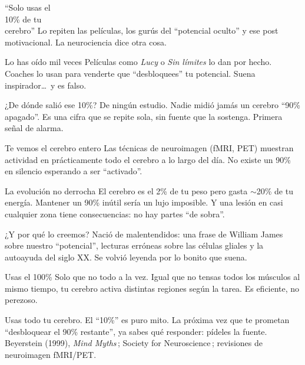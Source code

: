 \documentclass[10pt]{beamer}
\begin{document}
  {``Solo usas el\\ 10\% de tu\\ cerebro''}
  {Lo repiten las películas, los gurús del ``potencial oculto'' y ese
   post motivacional. La neurociencia dice otra cosa.}

  {Lo has oído mil veces}
  {Películas como \emph{Lucy} o \emph{Sin límites} lo dan por hecho.
   Coaches lo usan para venderte que ``desbloquees'' tu potencial.
   Suena inspirador\dots\ y es falso.}

  {¿De dónde salió ese 10\%?}
  {De ningún estudio. Nadie midió jamás un cerebro ``90\% apagado''.
   Es una cifra que se repite sola, sin fuente que la sostenga.
   Primera señal de alarma.}

  {Te vemos el cerebro entero}
  {Las técnicas de neuroimagen (fMRI, PET) muestran actividad en
   prácticamente todo el cerebro a lo largo del día. No existe un 90\%
   en silencio esperando a ser ``activado''.}

  {La evolución no derrocha}
  {El cerebro es el 2\% de tu peso pero gasta \mbox{$\sim$20\%} de tu
   energía. Mantener un 90\% inútil sería un lujo imposible. Y una lesión
   en casi cualquier zona tiene consecuencias: no hay partes ``de sobra''.}

  {¿Y por qué lo creemos?}
  {Nació de malentendidos: una frase de William James sobre nuestro
   ``potencial'', lecturas erróneas sobre las células gliales y la
   autoayuda del siglo XX. Se volvió leyenda por lo bonito que suena.}

  {Usas el 100\%}
  {Solo que no todo a la vez. Igual que no tensas todos los músculos
   al mismo tiempo, tu cerebro activa distintas regiones según la tarea.
   Es eficiente, no perezoso.}

  {Usas todo tu cerebro. El ``10\%'' es puro mito.}
  {La próxima vez que te prometan ``desbloquear el 90\% restante'',
   ya sabes qué responder: pídeles la fuente.}
  {Beyerstein (1999), \emph{Mind Myths}\,; Society for Neuroscience\,;
   revisiones de neuroimagen fMRI/PET.}
\end{document}
